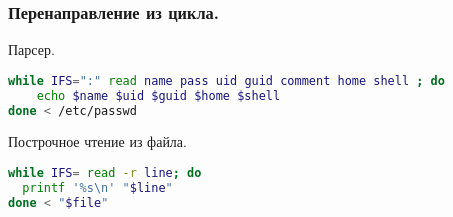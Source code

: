\begin{frame}[fragile]
\frametitle{Перенаправление из цикла.}

  \begin{block}{Парсер.}
    \begin{lstlisting}[language=sh,frame=single]
while IFS=":" read name pass uid guid comment home shell ; do
    echo $name $uid $guid $home $shell 
done < /etc/passwd
\end{lstlisting}
  \end{block}

  \begin{block}{Построчное чтение из файла.}
    \begin{lstlisting}[language=sh,frame=single]
while IFS= read -r line; do
  printf '%s\n' "$line"
done < "$file"
\end{lstlisting}
  \end{block}
\end{frame}
